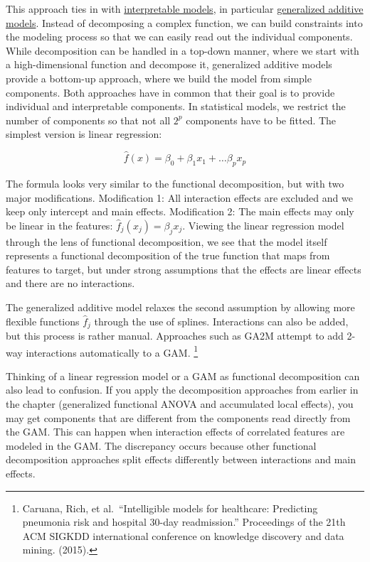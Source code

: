 \documentclass[
  11pt,
]{scrbook}
\begin{document}
This approach ties in with \protect\hyperlink{simple}{interpretable models}, in particular \protect\hyperlink{extend-lm}{generalized additive models}.
Instead of decomposing a complex function, we can build constraints into the modeling process so that we can easily read out the individual components.
While decomposition can be handled in a top-down manner, where we start with a high-dimensional function and decompose it, generalized additive models provide a bottom-up approach, where we build the model from simple components.
Both approaches have in common that their goal is to provide individual and interpretable components.
In statistical models, we restrict the number of components so that not all \(2^p\) components have to be fitted.
The simplest version is linear regression:

\[\hat{f}(x) = \beta_0 + \beta_1 x_1 + \ldots \beta_p x_p\]

The formula looks very similar to the functional decomposition, but with two major modifications.
Modification 1: All interaction effects are excluded and we keep only intercept and main effects.
Modification 2: The main effects may only be linear in the features: \(\hat{f}_j(x_j)=\beta_j{}x_j\).
Viewing the linear regression model through the lens of functional decomposition, we see that the model itself represents a functional decomposition of the true function that maps from features to target, but under strong assumptions that the effects are linear effects and there are no interactions.

The generalized additive model relaxes the second assumption by allowing more flexible functions \(\hat{f}_j\) through the use of splines.
Interactions can also be added, but this process is rather manual.
Approaches such as GA2M attempt to add 2-way interactions automatically to a GAM. \footnote{Caruana, Rich, et al.~``Intelligible models for healthcare: Predicting pneumonia risk and hospital 30-day readmission.'' Proceedings of the 21th ACM SIGKDD international conference on knowledge discovery and data mining. (2015).}

Thinking of a linear regression model or a GAM as functional decomposition can also lead to confusion.
If you apply the decomposition approaches from earlier in the chapter (generalized functional ANOVA and accumulated local effects), you may get components that are different from the components read directly from the GAM.
This can happen when interaction effects of correlated features are modeled in the GAM.
The discrepancy occurs because other functional decomposition approaches split effects differently between interactions and main effects.
\end{document}

